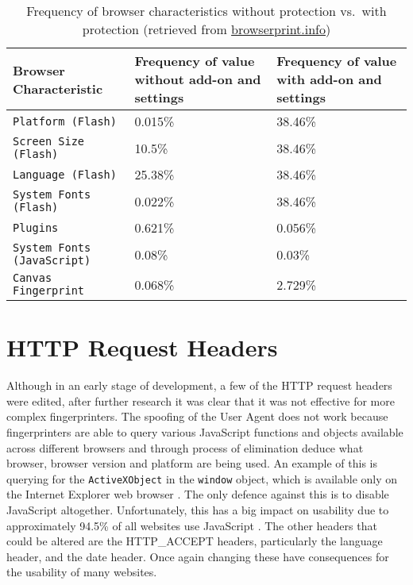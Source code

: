 \begin{table}[h!]
\centering
\begin{tabular}{| p{6cm} | p{4cm} | p{4cm} |}
    \hline
    \textbf{Browser Characteristic} & \textbf{Frequency of value without add-on and settings} & \textbf{Frequency of value with add-on and settings} \\ \hline
    \texttt{Platform (Flash)} & {0.015\%} & {38.46\%} \\ \hline
    \texttt{Screen Size (Flash)} & {10.5\%} & {38.46\%} \\ \hline
    \texttt{Language (Flash)} & {25.38\%} & {38.46\%} \\ \hline
    \texttt{System Fonts (Flash)} & {0.022\%} & {38.46\%} \\ \hline
    \texttt{Plugins} & {0.621\%} & {0.056\%} \\ \hline
    \texttt{System Fonts (JavaScript)} & {0.08\%} & {0.03\%} \\ \hline
    \texttt{Canvas Fingerprint} & {0.068\%} & {2.729\%} \\
    \hline
\end{tabular}
\caption{Frequency of browser characteristics without protection vs.\ with protection (retrieved from \url{browserprint.info})}
\label{tab:results}
\end{table}

\section{HTTP Request Headers}

Although in an early stage of development, a few of the HTTP request headers were edited, after further research it was clear that it was not effective for more complex fingerprinters.
The spoofing of the User Agent does not work because fingerprinters are able to query various JavaScript functions and objects available across different browsers and through process of elimination deduce what browser, browser version and platform are being used.
An example of this is querying for the \texttt{ActiveXObject} in the \texttt{window} object, which is available only on the Internet Explorer web browser \citep{activeX}.
The only defence against this is to disable JavaScript altogether.
Unfortunately, this has a big impact on usability due to approximately 94.5\% of all websites use JavaScript \citep{w3-javascript}.
The other headers that could be altered are the HTTP\_ACCEPT headers, particularly the language header, and the date header.
Once again changing these have consequences for the usability of many websites.

